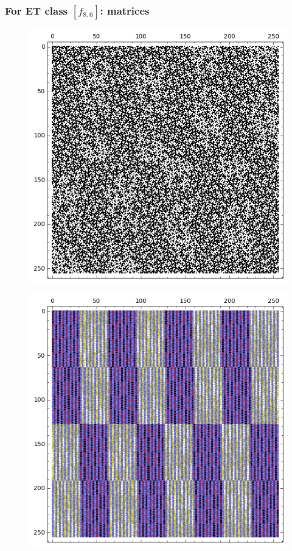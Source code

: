 \documentclass[pdf,sprung,slideColor,nocolorBG]{beamer}
\begin{document}
\begin{frame}
\frametitle{For ET class $[f_{8,6}]$: matrices}
\begin{figure}
\centering
\begin{minipage}{.48\textwidth}
  \centering
  \includegraphics[width=.9\linewidth]{../matrix_plot/c8_6_weight_class_matrix.png}
  \label{fig:8_6_weight_class_matrix}
\end{minipage}%
\begin{minipage}{.48\textwidth}
  \centering
  \includegraphics[width=.9\linewidth]{../matrix_plot/c8_6_bent_cayley_graph_index_matrix.png}
  \label{fig:8_6_bent_cayley_graph_index_matrix}
\end{minipage}
\end{figure}
\end{frame}
\end{document}
